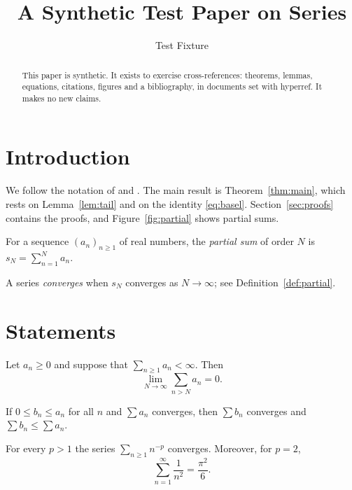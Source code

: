 \title{A Synthetic Test Paper on Series}
\author{Test Fixture}
\date{}
\maketitle
\begin{abstract}
This paper is synthetic. It exists to exercise cross-references: theorems, lemmas, equations,
citations, figures and a bibliography, in documents set with hyperref. It makes no new claims.
\end{abstract}

\section{Introduction}
We follow the notation of \cite{alpha} and \cite{beta}. The main result is
Theorem~\ref{thm:main}, which rests on Lemma~\ref{lem:tail} and on the identity \eqref{eq:basel}.
Section~\ref{sec:proofs} contains the proofs, and Figure~\ref{fig:partial} shows partial sums.

\begin{definition}\label{def:partial}
For a sequence $(a_n)_{n\ge 1}$ of real numbers, the \emph{partial sum} of order $N$ is
$s_N=\sum_{n=1}^{N}a_n$.
\end{definition}

\begin{remark}\label{rem:conv}
A series \emph{converges} when $s_N$ converges as $N\to\infty$; see Definition~\ref{def:partial}.
\end{remark}

\section{Statements}\label{sec:statements}
\begin{lemma}\label{lem:tail}
Let $a_n\ge 0$ and suppose that $\sum_{n\ge1}a_n<\infty$. Then
\begin{equation}\label{eq:tail}
\lim_{N\to\infty}\sum_{n>N}a_n = 0 .
\end{equation}
\end{lemma}

\begin{proposition}\label{prop:comp}
If $0\le b_n\le a_n$ for all $n$ and $\sum a_n$ converges, then $\sum b_n$ converges and
$\sum b_n\le\sum a_n$.
\end{proposition}

\begin{theorem}\label{thm:main}
For every $p>1$ the series $\sum_{n\ge1} n^{-p}$ converges. Moreover, for $p=2$,
\begin{equation}\label{eq:basel}
\sum_{n=1}^{\infty}\frac{1}{n^{2}}=\frac{\pi^{2}}{6}.
\end{equation}
\end{theorem}

